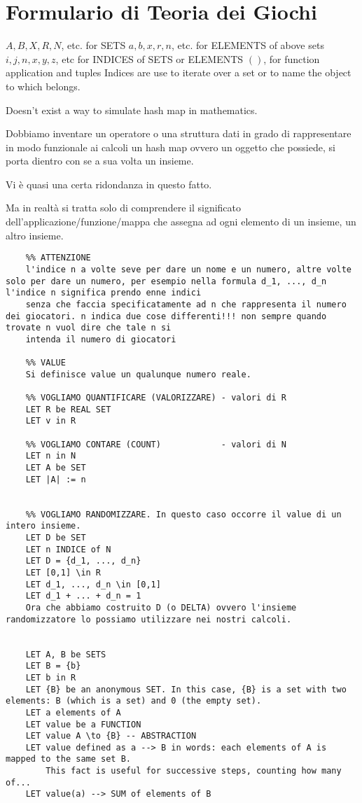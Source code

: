 \section{Formulario di Teoria dei Giochi}


$A, B, X, R, N$, etc. for SETS
$a, b, x, r, n$, etc. for ELEMENTS of above sets
$i, j, n, x, y, z$, etc for INDICES of SETS or ELEMENTS
$()$, for function application and tuples
Indices are use to iterate over a set or to name the object to which belongs.

Doesn't exist a way to simulate hash map in mathematics. 

Dobbiamo inventare un operatore o una struttura dati in grado di rappresentare in modo funzionale ai calcoli un hash map ovvero un oggetto che possiede, si porta dientro con se a sua volta un insieme.

Vi \`e quasi una certa ridondanza in questo fatto.

Ma in realt\`a si tratta solo di comprendere il significato dell'applicazione/funzione/mappa che assegna ad ogni elemento di un insieme, un altro insieme.


\begin{verbatim}
	%% ATTENZIONE
	l'indice n a volte seve per dare un nome e un numero, altre volte solo per dare un numero, per esempio nella formula d_1, ..., d_n l'indice n significa prendo enne indici
	senza che faccia specificatamente ad n che rappresenta il numero dei giocatori. n indica due cose differenti!!! non sempre quando trovate n vuol dire che tale n si
	intenda il numero di giocatori 

	%% VALUE
	Si definisce value un qualunque numero reale. 

    %% VOGLIAMO QUANTIFICARE (VALORIZZARE) - valori di R
    LET R be REAL SET
    LET v in R
    
    %% VOGLIAMO CONTARE (COUNT)            - valori di N 
    LET n in N
    LET A be SET
    LET |A| := n 
    
    
    %% VOGLIAMO RANDOMIZZARE. In questo caso occorre il value di un intero insieme.
    LET D be SET
    LET n INDICE of N
    LET D = {d_1, ..., d_n}   
    LET [0,1] \in R
    LET d_1, ..., d_n \in [0,1]
    LET d_1 + ... + d_n = 1    
    Ora che abbiamo costruito D (o DELTA) ovvero l'insieme randomizzatore lo possiamo utilizzare nei nostri calcoli.
    
    
	LET A, B be SETS
	LET B = {b}
	LET b in R
	LET {B} be an anonymous SET. In this case, {B} is a set with two elements: B (which is a set) and 0 (the empty set). 
	LET a elements of A 
	LET value be a FUNCTION
	LET value A \to {B} -- ABSTRACTION
	LET value defined as a --> B in words: each elements of A is mapped to the same set B. 
	    This fact is useful for successive steps, counting how many of...	    	    
	LET value(a) --> SUM of elements of B
\end{verbatim}

